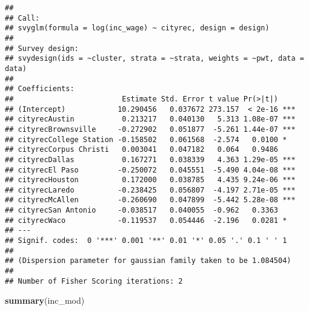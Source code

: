 \documentclass[]{article}
\newenvironment{Shaded}{\begin{snugshade}}{\end{snugshade}}
\newcommand{\KeywordTok}[1]{\textcolor[rgb]{0.13,0.29,0.53}{\textbf{#1}}}
\newcommand{\NormalTok}[1]{#1}
\begin{document}
\begin{verbatim}
## 
## Call:
## svyglm(formula = log(inc_wage) ~ cityrec, design = design)
## 
## Survey design:
## svydesign(ids = ~cluster, strata = ~strata, weights = ~pwt, data = data)
## 
## Coefficients:
##                         Estimate Std. Error t value Pr(>|t|)    
## (Intercept)            10.290456   0.037672 273.157  < 2e-16 ***
## cityrecAustin           0.213217   0.040130   5.313 1.08e-07 ***
## cityrecBrownsville     -0.272902   0.051877  -5.261 1.44e-07 ***
## cityrecCollege Station -0.158502   0.061568  -2.574   0.0100 *  
## cityrecCorpus Christi   0.003041   0.047182   0.064   0.9486    
## cityrecDallas           0.167271   0.038339   4.363 1.29e-05 ***
## cityrecEl Paso         -0.250072   0.045551  -5.490 4.04e-08 ***
## cityrecHouston          0.172000   0.038785   4.435 9.24e-06 ***
## cityrecLaredo          -0.238425   0.056807  -4.197 2.71e-05 ***
## cityrecMcAllen         -0.260690   0.047899  -5.442 5.28e-08 ***
## cityrecSan Antonio     -0.038517   0.040055  -0.962   0.3363    
## cityrecWaco            -0.119537   0.054446  -2.196   0.0281 *  
## ---
## Signif. codes:  0 '***' 0.001 '**' 0.01 '*' 0.05 '.' 0.1 ' ' 1
## 
## (Dispersion parameter for gaussian family taken to be 1.084504)
## 
## Number of Fisher Scoring iterations: 2
\end{verbatim}

\begin{Shaded}
\begin{Highlighting}[]
\KeywordTok{summary}\NormalTok{(inc_mod)}
\end{Highlighting}
\end{Shaded}
\end{document}
